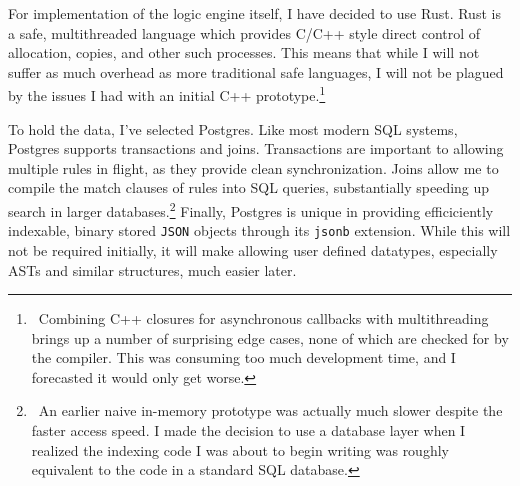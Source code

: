 For implementation of the logic engine itself, I have decided to use Rust\cite{rust}.
Rust is a safe, multithreaded language which provides C/C++ style direct control of allocation, copies, and other such processes.
This means that while I will not suffer as much overhead as more traditional safe languages, I will not be plagued by the issues I had with an initial C++ prototype.\footnote{\
        Combining C++ closures for asynchronous callbacks with multithreading brings up a number of surprising edge cases, none of which are checked for by the compiler.
        This was consuming too much development time, and I forecasted it would only get worse.
}

To hold the data, I've selected Postgres.
Like most modern SQL systems, Postgres supports transactions and joins.
Transactions are important to allowing multiple rules in flight, as they provide clean synchronization.
Joins allow me to compile the match clauses of rules into SQL queries, substantially speeding up search in larger databases.\footnote{\
        An earlier naive in-memory prototype was actually much slower despite the faster access speed.
I made the decision to use a database layer when I realized the indexing code I was about to begin writing was roughly equivalent to the code in a standard SQL database.
}
Finally, Postgres is unique in providing efficiciently indexable, binary stored \texttt{JSON} objects through its \texttt{jsonb} extension.
While this will not be required initially, it will make allowing user defined datatypes, especially ASTs and similar structures, much easier later.

